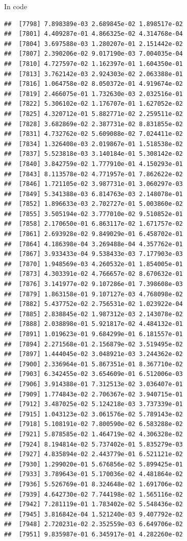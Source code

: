 \documentclass[ignorenonframetext,]{beamer}
\begin{document}
\begin{frame}[fragile]{In code}
\begin{verbatim}
##  [7798] 7.898389e-03 2.689845e-02 1.898517e-02
##  [7801] 4.409287e-01 4.866325e-02 4.314768e-04
##  [7804] 3.697588e-03 1.280207e-01 2.151442e-02
##  [7807] 2.390206e-02 9.017190e-03 7.004035e-04
##  [7810] 4.727597e-02 1.162397e-01 1.604350e-01
##  [7813] 3.762142e-03 2.924303e-02 2.063388e-01
##  [7816] 1.064758e-02 8.050372e-01 4.919674e-02
##  [7819] 2.466075e-01 1.732630e-03 2.032516e-01
##  [7822] 5.306102e-02 1.176707e-01 1.627052e-02
##  [7825] 4.320712e-01 5.882771e-02 2.259511e-02
##  [7828] 3.682869e-02 2.387731e-02 8.831855e-02
##  [7831] 4.732762e-02 5.609088e-02 7.024411e-02
##  [7834] 1.326408e-03 2.019867e-01 1.518538e-02
##  [7837] 5.523818e-03 3.140184e-01 5.308142e-02
##  [7840] 3.842759e-02 1.777910e-01 4.150293e-01
##  [7843] 8.113578e-02 4.771957e-01 7.862622e-02
##  [7846] 1.721105e-02 3.987731e-01 3.060297e-03
##  [7849] 5.341388e-03 6.814763e-03 2.148078e-01
##  [7852] 1.896633e-03 2.702727e-01 5.003860e-02
##  [7855] 3.505194e-02 3.777010e-02 9.510852e-01
##  [7858] 2.170650e-01 6.863117e-02 1.671757e-02
##  [7861] 2.693928e-02 9.849029e-01 6.458702e-01
##  [7864] 4.186398e-04 3.269488e-04 4.357762e-01
##  [7867] 3.933433e-04 9.538433e-03 7.177903e-03
##  [7870] 1.948569e-03 4.260532e-01 1.854005e-01
##  [7873] 4.303391e-02 4.766657e-02 8.670632e-01
##  [7876] 3.141977e-02 9.107286e-01 7.398608e-03
##  [7879] 1.863158e-01 9.107127e-03 4.768098e-02
##  [7882] 5.437752e-02 2.756531e-02 1.023922e-04
##  [7885] 2.838845e-02 1.987312e-03 2.143078e-02
##  [7888] 2.038898e-01 5.921817e-02 4.484132e-01
##  [7891] 1.019623e-01 9.684299e-01 6.181557e-01
##  [7894] 2.271568e-01 2.156879e-02 3.519495e-02
##  [7897] 1.444045e-02 3.048921e-03 3.244362e-02
##  [7900] 2.336964e-01 5.867351e-01 8.367710e-02
##  [7903] 6.342455e-02 3.654609e-01 6.512006e-03
##  [7906] 3.914388e-01 7.312513e-02 3.036407e-01
##  [7909] 1.774843e-02 2.706367e-02 3.940715e-01
##  [7912] 3.487025e-02 5.124218e-03 3.737339e-01
##  [7915] 1.043123e-02 3.061576e-02 5.789143e-02
##  [7918] 5.108191e-02 7.800590e-02 6.583288e-02
##  [7921] 5.878585e-02 1.464719e-02 4.306328e-02
##  [7924] 8.194814e-02 5.737402e-01 5.835279e-03
##  [7927] 4.835894e-02 2.443779e-01 6.521121e-02
##  [7930] 1.299020e-01 5.676856e-02 5.899425e-01
##  [7933] 3.789643e-01 5.170036e-02 4.481864e-02
##  [7936] 5.526769e-01 8.324648e-02 1.691706e-02
##  [7939] 4.642730e-02 7.744198e-02 1.565116e-02
##  [7942] 7.281119e-01 1.783402e-02 5.548436e-02
##  [7945] 3.816842e-04 1.521240e-03 9.407792e-02
##  [7948] 2.720231e-02 2.352559e-03 6.649706e-02
##  [7951] 9.835987e-01 6.345917e-01 4.282260e-02

\end{verbatim}
\end{frame}
\end{document}
